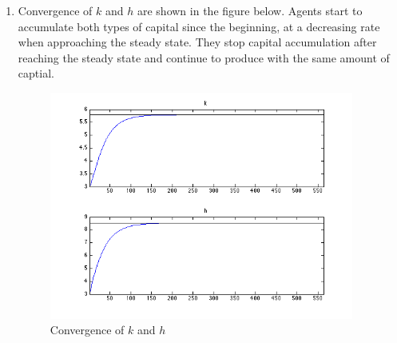 \begin{enumerate}
\item
Convergence of $k$ and $h$ are shown in the figure below. Agents start to accumulate both types of capital since the beginning, at a decreasing rate when approaching the steady state. They stop capital accumulation after reaching the steady state and continue to produce with the same amount of captial.\\
\begin{figure}[htbp]
\begin{center}
	\includegraphics[width=10cm]{Figure/Q4_6.png}	
\caption{Convergence of $k$ and $h$}
\end{center}
\end{figure}
\end{enumerate}